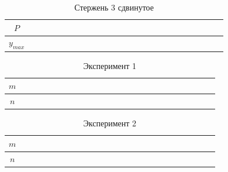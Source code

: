 \documentclass[a4paper,12pt]{article} %
\begin{document}
    \begin{table}[!ht]
        \centering
        \begin{tabular}{|c|c|c|c|c|c|c|c|c|c|c}
            \hline
        $ P $   & ~~~ & ~~~ & ~~~ & ~~~ & ~~~ & ~~~ & ~~~ &  ~~~ \\ \hline
        $y_{max}$ & ~~~ & ~~~ & ~~~ & ~~~ & ~~~ & ~~~ & ~~~ &  ~~~\\ \hline
        \end{tabular}
        \caption{Стержень 3 сдвинутое}
    \end{table}
    \begin{table}[!ht]
        \centering
        \begin{tabular}{|c|c|c|c|c|c|c|c|c|c|c}
            \hline
        $ m $   & ~~~ & ~~~ & ~~~ & ~~~ & ~~~ & ~~~ & ~~~ &  ~~~ \\ \hline
        $n$ & ~~~ & ~~~ & ~~~ & ~~~ & ~~~ & ~~~ & ~~~ &  ~~~\\ \hline
        \end{tabular}
        \caption{Эксперимент 1}
    \end{table}
    \begin{table}[!ht]
        \centering
        \begin{tabular}{|c|c|c|c|c|c|c|c|c|c|c}
            \hline
        $ m $   & ~~~ & ~~~ & ~~~ & ~~~ & ~~~ & ~~~ & ~~~ &  ~~~ \\ \hline
        $ n $ & ~~~ & ~~~ & ~~~ & ~~~ & ~~~ & ~~~ & ~~~ &  ~~~\\ \hline
        \end{tabular}
        \caption{Эксперимент 2}
    \end{table}
\end{document}
